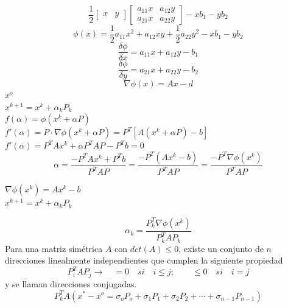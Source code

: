 \begin{displaymath}
\frac{1}{2}\begin{bmatrix}
x & y \end{bmatrix}\begin{bmatrix}
a_{11}x & a_{12}y \\ a_{21}x & a_{22}y\end{bmatrix}- xb_1 - yb_2
\end{displaymath}
\begin{displaymath}
\phi(x)=\frac{1}{2}a_{11}x^2+a_{12}xy+\frac{1}{2}a_{22}y^2-xb_1-yb_2
\end{displaymath}
\begin{displaymath}
\frac{\delta\phi}{\delta x}=a_{11}x+a_{12}y-b_1
\end{displaymath}
\begin{displaymath}
\frac{\delta\phi}{\delta y}=a_{21}x+a_{22}y-b_2
\end{displaymath}
\begin{displaymath}
\boxed{\nabla\phi(x)=Ax-d}
\end{displaymath}
$x^o$\\
$x^{k+1}=x^k+\alpha_kP_k$\\
$f(\alpha)=\phi(x^k+\alpha P)$\\
$f'(\alpha)=P\cdot\nabla\phi(x^k+\alpha P)=P^T[A(x^k+\alpha P)-b]$\\
$f'(\alpha)=P^TAx^k+\alpha P^TAP-P^Tb=0$
\begin{displaymath}
\alpha=\frac{-P^TAx^k+P^Tb}{P^TAP}=\frac{-P^T(Ax^k-b)}{P^TAP}=\frac{-P^T\nabla\phi(x^k)}{P^TAP}
\end{displaymath}
\begin{center}
$\nabla\phi(x^k)=Ax^k-b$\\
$x^{k+1}=x^k+\alpha_kP_k$
\end{center}
\begin{displaymath}
\alpha_k=\frac{P_k^T\nabla\phi(x^k)}{P_k^TAP_k}
\end{displaymath}
Para una matriz sim\'etrica $A$ con $det(A)\leq 0$, existe un conjunto de $n$ direcciones linealmente independientes que cumplen la siguiente propiedad
\begin{displaymath}
P_i^TAP_j\rightarrow\quad =0\quad si\quad i\leq j ;\qquad \leq 0 \quad si\quad i=j
\end{displaymath}
y se llaman direcciones conjugadas.
\begin{displaymath}
P_k^TA(x^*-x^o=\sigma_oP_o+\sigma_1P_1+\sigma_2P_2+\cdots+\sigma_{n-1}P_{n-1})
\end{displaymath}

